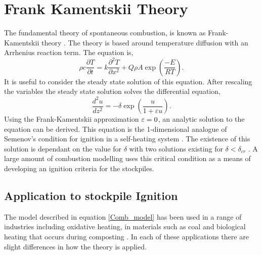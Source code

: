 \section{Frank Kamentskii Theory}
The fundamental theory of spontaneous combustion, is known as Frank-Kamentskii theory \cite{bowes}. The theory is based around temperature diffusion with an Arrhenius reaction term. The equation is,
\begin{equation}
\rho c\frac{\partial T}{\partial t}=k\frac{\partial^2 T}{\partial x^2}+Q\rho A\exp\left(\frac{-E}{RT}\right). \label{Comb_model}
\end{equation}
It is useful to consider the steady state solution of this equation.  
After rescaling the variables the steady state solution solves the differential equation,
\begin{equation}
\frac{d^2u}{dz^2}=-\delta\exp\left(\frac{u}{1+\varepsilon u}\right). \label{FK_mod}
\end{equation}
Using the Frank-Kamentskii approximation $\varepsilon=0$, an analytic solution to the equation can be derived. This equation is the 1-dimensional analogue of Semenov's condition for ignition in a self-heating system \cite{bowes}.  The existence of this solution is dependant on the value for $\delta$ with two solutions existing for $\delta<\delta_{cr}$ \cite{bowes}. A large amount of combustion modelling uses this critical condition as a means of developing an ignition criteria for the stockpiles.
\subsection{Application to stockpile Ignition}
The model described in equation \eqref{Comb_model} has been used in a range of industries including oxidative heating, in materials such as coal and biological heating that occurs during composting \cite{bowes}. In each of these applications there are slight differences in how the theory is applied. 
